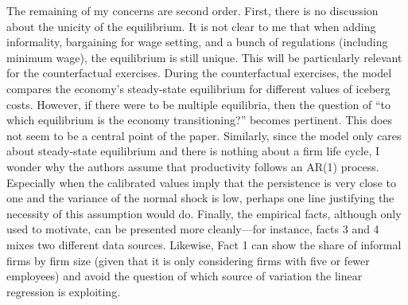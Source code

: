 \documentclass[12pt,oneside,reqno]{amsart}
\begin{document}
The remaining of my concerns are second order. First, there is no discussion about the unicity of the equilibrium. It is not clear to me that when adding informality, bargaining for wage setting, and a bunch of regulations (including minimum wage), the equilibrium is still unique. This will be particularly relevant for the counterfactual exercises. During the counterfactual exercises, the model compares the economy's steady-state equilibrium for different values of iceberg costs. However, if there were to be multiple equilibria, then the question of ``to which equilibrium is the economy transitioning?'' becomes pertinent. This does not seem to be a central point of the paper.
Similarly, since the model only cares about steady-state equilibrium and there is nothing about a firm life cycle, I wonder why the authors assume that productivity follows an AR(1) process. Especially when the calibrated values imply that the persistence is very close to one and the variance of the normal shock is low, perhaps one line justifying the necessity of this assumption would do. Finally, the empirical facts, although only used to motivate, can be presented more cleanly—for instance, facts 3 and 4 mixes two different data sources. Likewise, Fact 1 can show the share of informal firms by firm size (given that it is only considering firms with five or fewer employees) and avoid the question of which source of variation the linear regression is exploiting. 
\end{document}
